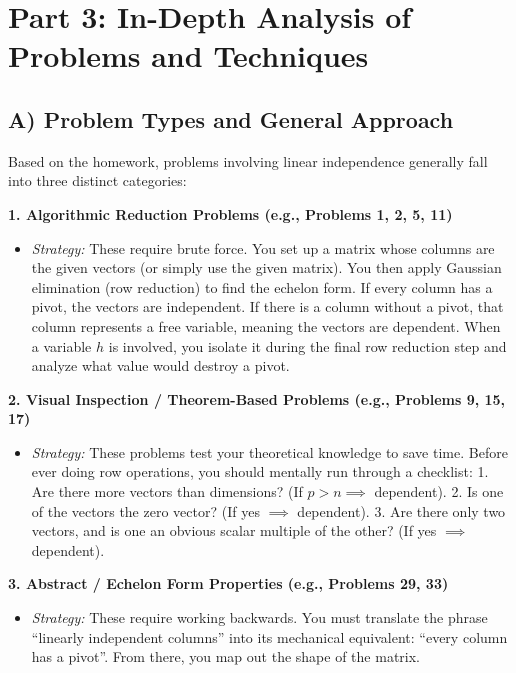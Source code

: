 \documentclass[11pt]{article}
\begin{document}
\newpage

\section{Part 3: In-Depth Analysis of Problems and Techniques}

\subsection{A) Problem Types and General Approach}
Based on the homework, problems involving linear independence generally fall into three distinct categories:

\textbf{1. Algorithmic Reduction Problems (e.g., Problems 1, 2, 5, 11)}
\begin{itemize}
    \item \textit{Strategy:} These require brute force. You set up a matrix whose columns are the given vectors (or simply use the given matrix). You then apply Gaussian elimination (row reduction) to find the echelon form. If every column has a pivot, the vectors are independent. If there is a column without a pivot, that column represents a free variable, meaning the vectors are dependent. When a variable $h$ is involved, you isolate it during the final row reduction step and analyze what value would destroy a pivot.
\end{itemize}

\textbf{2. Visual Inspection / Theorem-Based Problems (e.g., Problems 9, 15, 17)}
\begin{itemize}
    \item \textit{Strategy:} These problems test your theoretical knowledge to save time. Before ever doing row operations, you should mentally run through a checklist: 
    1. Are there more vectors than dimensions? (If $p > n \implies$ dependent).
    2. Is one of the vectors the zero vector? (If yes $\implies$ dependent).
    3. Are there only two vectors, and is one an obvious scalar multiple of the other? (If yes $\implies$ dependent).
\end{itemize}

\textbf{3. Abstract / Echelon Form Properties (e.g., Problems 29, 33)}
\begin{itemize}
    \item \textit{Strategy:} These require working backwards. You must translate the phrase ``linearly independent columns'' into its mechanical equivalent: ``every column has a pivot''. From there, you map out the shape of the matrix.
\end{itemize}
\end{document}
